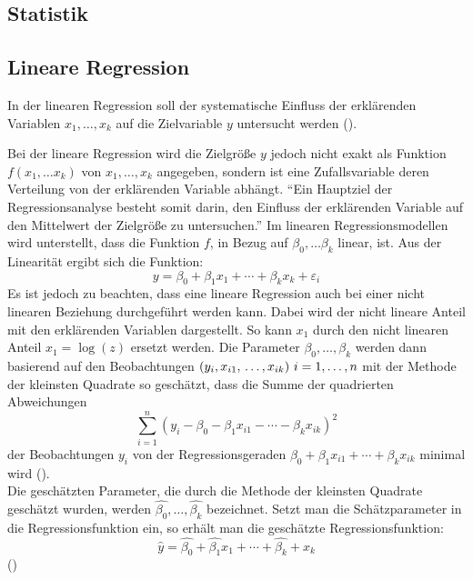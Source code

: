 \begin{appendix}
\chapter{Statistik} \label{Statistik}
\section{Lineare Regression} \label{append:LinReg}
In der linearen Regression soll der systematische Einfluss der erklärenden Variablen $x_1, \ldots, x_k$ auf die Zielvariable $y$ untersucht werden (\cite{Fahrmeir.2009}).

Bei der lineare Regression wird die Zielgröße $y$ jedoch nicht exakt als Funktion $f(x_1, \ldots x_k)$ von $x_1, \ldots, x_k$ angegeben, sondern ist eine Zufallsvariable deren Verteilung von der erklärenden Variable abhängt. "`Ein Hauptziel der Regressionsanalyse besteht somit darin, den Einfluss der erklärenden Variable auf den Mittelwert der Zielgröße zu untersuchen."' \cite{Fahrmeir.2009} Im linearen Regressionsmodellen wird unterstellt, dass die Funktion $f$, in Bezug auf $\beta_0, \ldots \beta_k$ linear, ist. Aus der Linearität ergibt sich die Funktion: 
$$ y = \beta_0 + \beta_1x_1 + \cdots + \beta_kx_k + \varepsilon_i $$
Es ist jedoch zu beachten, dass eine lineare Regression auch bei einer nicht linearen Beziehung durchgeführt werden kann. Dabei wird der nicht lineare Anteil mit den erklärenden Variablen dargestellt. So kann $x_1$ \zB durch den nicht linearen Anteil $x_1 = \log(z)$ ersetzt werden.
Die Parameter $\beta_0, \ldots, \beta_k$ werden dann basierend auf den Beobachtungen $(y_i, x_{i1}, \\ \ldots, x_{ik}) \ i=1, \ldots, n$ mit der Methode der kleinsten Quadrate so geschätzt, dass die Summe der quadrierten Abweichungen 
$$ \sum_{i=1}^{n}(y_i - \beta_0 - \beta_1x_{i1} - \cdots - \beta_kx_{ik})^2$$
der Beobachtungen $y_i$ von der Regressionsgeraden $\beta_0 + \beta_1x_{i1} + \cdots + \beta_kx_{ik}$ minimal wird (\cite{Fahrmeir.2009}).\\
Die geschätzten Parameter, die durch die Methode der kleinsten Quadrate geschätzt wurden, werden $\hat{\beta_0}, \ldots, \hat{\beta_k}$ bezeichnet. Setzt man die Schätzparameter in die Regressionsfunktion ein, so erhält man die geschätzte Regressionsfunktion:
$$\hat{y} = \hat{\beta_0} + \hat{\beta_1}x_1 + \cdots + \hat{\beta_k} + x_k$$ (\cite{Fahrmeir.2009})

\end{appendix}
